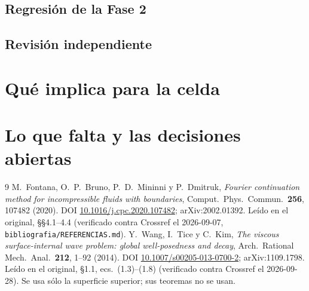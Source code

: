 \documentclass[11pt,a4paper]{article}
\newcommand{\archivo}[1]{\nolinkurl{#1}}
\begin{document}


\subsection{Regresión de la Fase 2}
\label{sec:regresion}



\subsection{Revisión independiente}



\section{Qué implica para la celda}
\label{sec:celda}



\section{Lo que falta y las decisiones abiertas}
\label{sec:falta}



\begin{thebibliography}{9}
 M.~Fontana, O.~P.~Bruno, P.~D.~Mininni y P.~Dmitruk,
  \emph{Fourier continuation method for incompressible fluids with boundaries},
  Comput.\ Phys.\ Commun.\ \textbf{256}, 107482 (2020).
  DOI \href{https://doi.org/10.1016/j.cpc.2020.107482}{10.1016/j.cpc.2020.107482};
  arXiv:2002.01392. Leído en el original, §§4.1--4.4 (verificado contra Crossref el
  2026-09-07, \archivo{bibliografia/REFERENCIAS.md}).
 Y.~Wang, I.~Tice y C.~Kim, \emph{The viscous surface-internal wave
  problem: global well-posedness and decay}, Arch.\ Rational Mech.\ Anal.\ \textbf{212},
  1--92 (2014). DOI
  \href{https://doi.org/10.1007/s00205-013-0700-2}{10.1007/s00205-013-0700-2};
  arXiv:1109.1798. Leído en el original, §1.1, ecs.\ (1.3)--(1.8) (verificado contra
  Crossref el 2026-09-28). Se usa sólo la superficie superior; sus teoremas no se usan.
\end{thebibliography}
\end{document}
